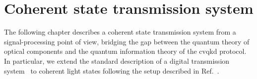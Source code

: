 \chapter{Coherent state transmission system}

The following chapter describes a coherent state transmission system from a signal-processing point of view, bridging the gap between the quantum theory of optical components and the quantum information theory of the \gls{cvqkd} protocol.
In particular, we extend the standard description of a digital transmission system~\cite{Gallager2008,Nossek2015,Oppenheim1989,Proakis2007} to coherent light states following the setup described in Ref.~\cite{Brunner2017}.